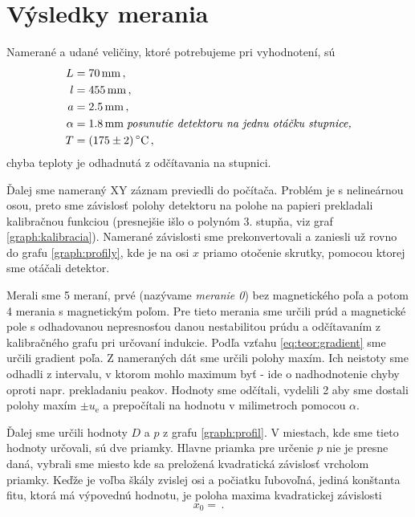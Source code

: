 \documentclass[a4paper, 10pt]{article}
\newcommand{\unit}[1]{\ensuremath{\, \mathrm{#1}}}
\newcommand{\di}[1]{\ensuremath{_\mathrm{#1}}}
\begin{document}
\section*{Výsledky merania}
Namerané a udané veličiny, ktoré potrebujeme pri vyhodnotení, sú
\begin{align*}
L &= 70 \unit{mm}\,, \\
l &= 455 \unit{mm}\,, \\ 
a &= 2.5 \unit{mm}\,, \\
\alpha &= 1.8\unit{mm}\; \text{\it posunutie detektoru na jednu otáčku stupnice,}\\
T &= (175\pm 2) \unit{^\circ C}\,,\\
\end{align*}
chyba teploty je odhadnutá z odčítavania na stupnici.

Ďalej sme nameraný XY záznam previedli do počítača. Problém je s nelineárnou osou, preto sme závislosť polohy detektoru na polohe na papieri prekladali kalibračnou funkciou (presnejšie išlo o polynóm 3. stupňa, viz graf \ref{graph:kalibracia}). Namerané závislosti sme prekonvertovali a zaniesli už rovno do grafu \ref{graph:profily}, kde je na osi $x$ priamo otočenie skrutky, pomocou ktorej sme otáčali detektor.

Merali sme 5 meraní, prvé (nazývame \textit{meranie 0}) bez magnetického poľa a potom 4 merania s magnetickým poľom. Pre tieto merania sme určili prúd a magnetické pole s odhadovanou nepresnosťou danou nestabilitou prúdu a odčítavaním z kalibračného grafu pri určovaní indukcie. Podľa vzťahu \ref{eq:teor:gradient} sme určili gradient poľa. Z nameraných dát sme určili polohy maxím. Ich neistoty sme odhadli z intervalu, v ktorom mohlo maximum byť - ide o nadhodnotenie chyby oproti napr. prekladaniu peakov. Hodnoty sme odčítali, vydelili 2 aby sme dostali polohy maxím $\pm u\di e$ a prepočítali na hodnotu v milimetroch pomocou $\alpha$.

Ďalej sme určili hodnoty $D$ a $p$ z grafu \ref{graph:profil}. V miestach, kde sme tieto hodnoty určovali, sú dve priamky. Hlavne priamka pre určenie $p$ nie je presne daná, vybrali sme miesto kde sa preložená kvadratická závislosť vrcholom priamky. Keďže je voľba škály zvislej osi a počiatku ľubovoľná, jediná konštanta fitu, ktorá má výpovednú hodnotu, je poloha maxima kvadratickej závislosti 
$$
x_0 = \,.
$$
\end{document}
